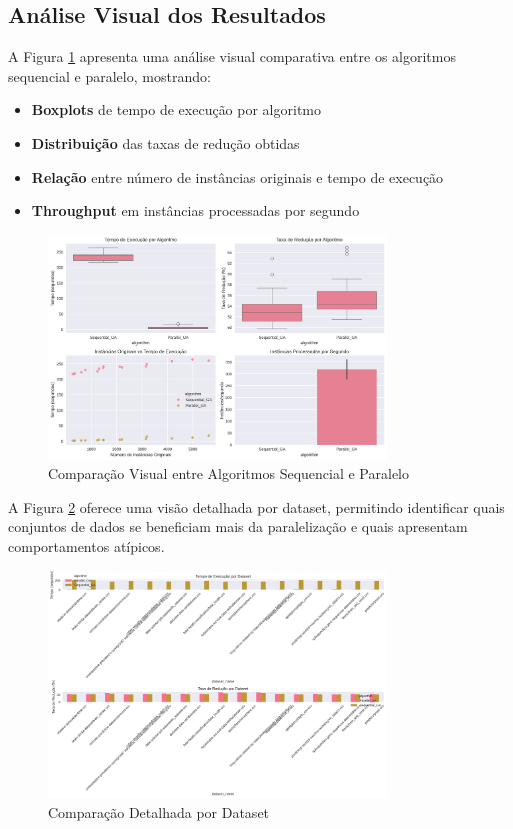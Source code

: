\documentclass[12pt,a4paper]{article}
\begin{document}
\subsection{Análise Visual dos Resultados}

A Figura \ref{fig:algorithm_comparison} apresenta uma análise visual comparativa entre os algoritmos sequencial e paralelo, mostrando:
\begin{itemize}
    \item \textbf{Boxplots} de tempo de execução por algoritmo
    \item \textbf{Distribuição} das taxas de redução obtidas
    \item \textbf{Relação} entre número de instâncias originais e tempo de execução
    \item \textbf{Throughput} em instâncias processadas por segundo
\end{itemize}

\begin{figure}[H]
\centering
\includegraphics[width=0.8\textwidth]{algorithm_comparison.png}
\caption{Comparação Visual entre Algoritmos Sequencial e Paralelo}
\label{fig:algorithm_comparison}
\end{figure}

A Figura \ref{fig:detailed_comparison} oferece uma visão detalhada por dataset, permitindo identificar quais conjuntos de dados se beneficiam mais da paralelização e quais apresentam comportamentos atípicos.

\begin{figure}[H]
\centering
\includegraphics[width=0.8\textwidth]{detailed_comparison.png}
\caption{Comparação Detalhada por Dataset}
\label{fig:detailed_comparison}
\end{figure}
\end{document}
